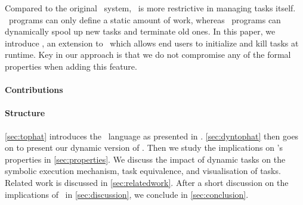 Compared to the original \ITASKS\ system, \TOPHAT\ is more restrictive in managing tasks itself.
\TOPHAT\ programs can only define a static amount of work, whereas \ITASKS\ programs can dynamically spool up new tasks and terminate old ones.
In this paper, we introduce \DYNTOPHAT, an extension to \TOPHAT\ which allows end users to initialize and kill tasks at runtime.
Key in our approach is that we do not compromise any of the formal properties when adding this feature.

\paragraph{Contributions}


\paragraph{Structure}

\cref{sec:tophat} introduces the \TOPHAT\ language as presented in \citet{Steenvoorden22}.
\cref{sec:dyntophat} then goes on to present our dynamic version of \TOPHAT.
Then we study the implications on \TOPHAT's properties in \cref{sec:properties}.
We discuss the impact of dynamic tasks on the symbolic execution mechanism, task equivalence, and visualisation of tasks.
Related work is discussed in \cref{sec:relatedwork}.
After a short discussion on the implications of \DYNTOPHAT\ in \cref{sec:discussion},
we conclude in \cref{sec:conclusion}.
